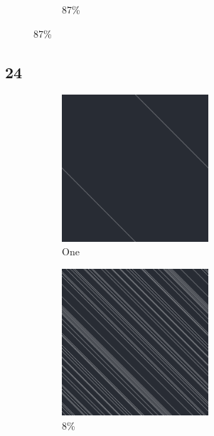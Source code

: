 \documentclass[12pt, fleqn]{report}                             %
\theoremstyle{break}                                            %
\begin{document}
\begin{figure}[ht!]
\begin{subfigure}[b]{0.4\linewidth}
          \caption{87\%}
        \end{subfigure}
      \end{figure}


      \clearpage
      \subsection{24}
      \begin{figure}[ht!]
        \centering
        \begin{subfigure}[b]{0.4\linewidth}
          \includegraphics[width=0.6\textwidth]{Images/24/a.png}
          \caption{One}
        \end{subfigure}
        \begin{subfigure}[b]{0.4\linewidth}
          \includegraphics[width=0.6\textwidth]{Images/24/b.png}
          \caption{8\%}
        \end{subfigure}
        \begin{subfigure}[b]{0.4\linewidth}

\end{subfigure}
\end{figure}
\end{document}
